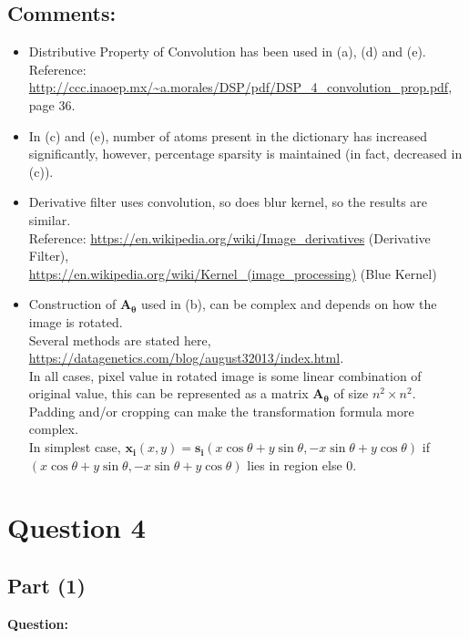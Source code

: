 \documentclass[fleqn, 11pt]{article}
\newcommand{\bs}[1]{\boldsymbol{#1}}
\begin{document}
\subsection*{Comments:}
\begin{itemize}
    \item Distributive Property of Convolution has been used in (a), (d) and (e). \\ Reference: \url{http://ccc.inaoep.mx/~a.morales/DSP/pdf/DSP_4_convolution_prop.pdf}, page 36.
    \item In (c) and (e), number of atoms present in the dictionary has increased significantly, however, percentage sparsity is maintained (in fact, decreased in (c)).
    \item Derivative filter uses convolution, so does blur kernel, so the results are similar. \\
    Reference: \url{https://en.wikipedia.org/wiki/Image_derivatives} (Derivative Filter), \\ \url{https://en.wikipedia.org/wiki/Kernel_(image_processing)} (Blue Kernel)
    \item Construction of $\bs{A_\theta}$ used in (b), can be complex and depends on how the image is rotated. \\
    Several methods are stated here, \url{https://datagenetics.com/blog/august32013/index.html}. \\
    In all cases, pixel value in rotated image is some linear combination of original value, this can be represented as a matrix $\bs{A_\theta}$ of size $n^2 \times n^2$. \\
    Padding and/or cropping can make the transformation formula more complex. \\
    In simplest case, $\bs{x_i}(x, y) = \bs{s_i}(x \cos{\theta} + y \sin{\theta}, -x \sin{\theta} + y \cos{\theta})$ if $(x \cos{\theta} + y \sin{\theta}, -x \sin{\theta} + y \cos{\theta})$ lies in region else $0$.
\end{itemize}


\newpage
\section*{Question 4}
\setcounter{equation}{0}

\subsection*{Part (1)}

\textbf{Question: }
\end{document}
